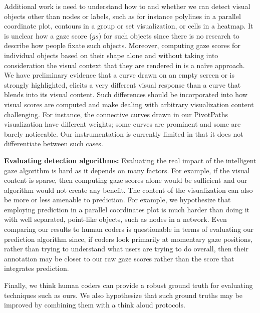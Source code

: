 Additional work is need to understand how to and whether we can detect visual objects other than nodes or labels, such as for instance polylines in a parallel coordinate plot, contours in a group or set visualization, or cells in a heatmap. It is unclear how a gaze score ($gs$) for such objects since there is no research to describe how people fixate such objects. Moreover, computing gaze scores for individual objects based on their shape alone and without taking into consideration the visual context that they are rendered in is a naïve approach. We have preliminary evidence that a curve drawn on an empty screen or is strongly highlighted, elicits a very different visual response than a curve that blends into its visual content. Such differences should be incorporated into how visual scores are computed and make dealing with arbitrary visualization content challenging. For instance, the connective curves drawn in our PivotPaths visualization have different weights; some curves are prominent and some are barely noticeable. Our instrumentation is currently limited in that it does not differentiate between such cases.

\textbf{Evaluating detection algorithms:} Evaluating the real impact of the intelligent gaze algorithm is hard as it depends on many factors. For example, if the visual content is sparse, then computing gaze scores alone would be sufficient and our algorithm would not create any benefit. The content of the visualization can also be more or less amenable to prediction. For example, we hypothesize that employing prediction in a parallel coordinates plot is much harder than doing it with well separated, point-like objects, such as nodes in a network. Even comparing our results to human coders is questionable in terms of evaluating our prediction algorithm since, if coders look primarily at momentary gaze positions, rather than trying to understand what users are trying to do overall, then their annotation may be closer to our raw gaze scores rather than the score that integrates prediction. 

Finally, we think human coders can provide a robust ground truth for evaluating techniques such as ours. We also hypothesize that such ground truths may be improved by combining them with a think aloud protocols. 
